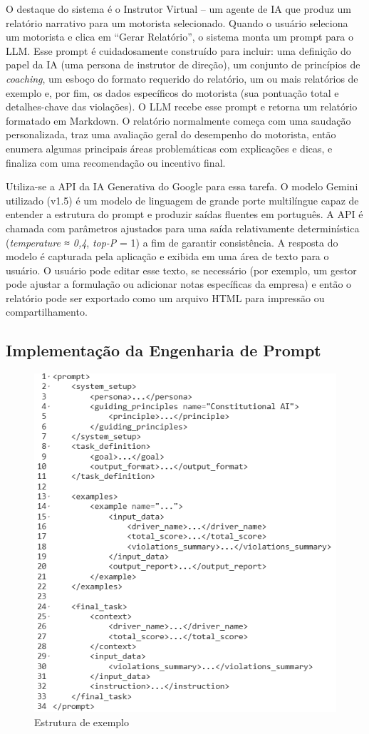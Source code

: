 \documentclass[12pt]{article}
\begin{document}
O destaque do sistema é o Instrutor Virtual – um agente de IA que produz um relatório narrativo para um motorista selecionado. Quando o usuário seleciona um motorista e clica em “Gerar Relatório”, o sistema monta um prompt para o LLM. Esse prompt é cuidadosamente construído para incluir: uma definição do papel da IA (uma persona de instrutor de direção), um conjunto de princípios de \textit{coaching}, um esboço do formato requerido do relatório, um ou mais relatórios de exemplo e, por fim, os dados específicos do motorista (sua pontuação total e detalhes-chave das violações). O LLM recebe esse prompt e retorna um relatório formatado em Markdown. O relatório normalmente começa com uma saudação personalizada, traz uma avaliação geral do desempenho do motorista, então enumera algumas principais áreas problemáticas com explicações e dicas, e finaliza com uma recomendação ou incentivo final.

Utiliza-se a API da IA Generativa do Google para essa tarefa. O modelo Gemini utilizado (v1.5) \cite{google2023} é um modelo de linguagem de grande porte multilíngue capaz de entender a estrutura do prompt e produzir saídas fluentes em português. A API é chamada com parâmetros ajustados para uma saída relativamente determinística (\textit{temperature ≈ 0,4}, \textit{top-P} = 1) a fim de garantir consistência. A resposta do modelo é capturada pela aplicação e exibida em uma área de texto para o usuário. O usuário pode editar esse texto, se necessário (por exemplo, um gestor pode ajustar a formulação ou adicionar notas específicas da empresa) e então o relatório pode ser exportado como um arquivo HTML para impressão ou compartilhamento.


\subsection{Implementação da Engenharia de Prompt}

\begin{figure}[ht]
\centering
\includegraphics[width=.4\textwidth]{prompt_black_white.png}
\caption{Estrutura de exemplo}
\label{fig:exampleFig1}
\end{figure}
\end{document}
